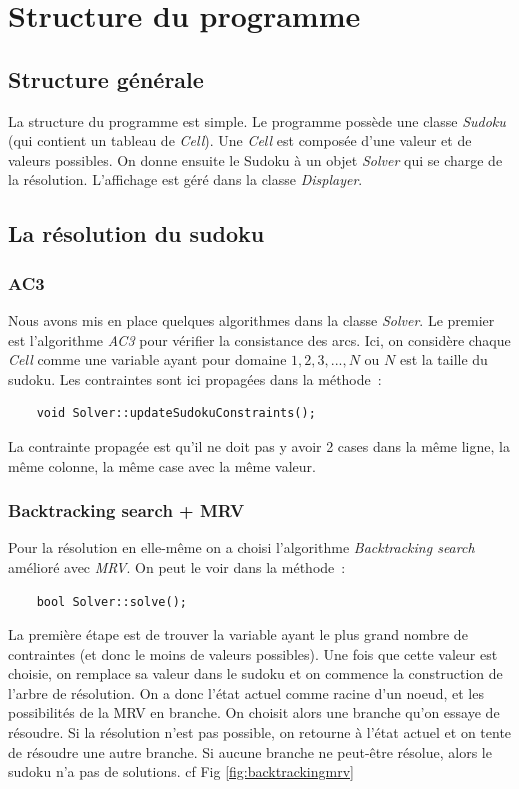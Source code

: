 \documentclass{article}
\begin{document}
\section{Structure du programme}
\subsection{Structure générale}

La structure du programme est simple. Le programme possède une classe \emph{Sudoku} (qui contient un tableau de \emph{Cell}). Une \emph{Cell} est composée d'une valeur et de valeurs possibles. On donne ensuite le Sudoku à un objet \emph{Solver} qui se charge de la résolution. L'affichage est géré dans la classe \emph{Displayer}.

\subsection{La résolution du sudoku}

\subsubsection{AC3}

Nous avons mis en place quelques algorithmes dans la classe \emph{Solver}. Le premier est l'algorithme \emph{AC3} pour vérifier la consistance des arcs. Ici, on considère chaque \emph{Cell} comme une variable ayant pour domaine ${1,2,3,...,N}$ ou $N$ est la taille du sudoku. Les contraintes sont ici propagées dans la méthode~:

\begin{verbatim}
	void Solver::updateSudokuConstraints();
\end{verbatim}

La contrainte propagée est qu'il ne doit pas y avoir 2 cases dans la même ligne, la même colonne, la même case avec la même valeur.

\subsubsection{Backtracking search + MRV}

Pour la résolution en elle-même on a choisi l'algorithme \emph{Backtracking search} amélioré avec \emph{MRV}. On peut le voir dans la méthode~:
\begin{verbatim}
	bool Solver::solve();
\end{verbatim}

La première étape est de trouver la variable ayant le plus grand nombre de contraintes (et donc le moins de valeurs possibles). Une fois que cette valeur est choisie, on remplace sa valeur dans le sudoku et on commence la construction de l'arbre de résolution. On a donc l'état actuel comme racine d'un noeud, et les possibilités de la MRV en branche. On choisit alors une branche qu'on essaye de résoudre. Si la résolution n'est pas possible, on retourne à l'état actuel et on tente de résoudre une autre branche. Si aucune branche ne peut-être résolue, alors le sudoku n'a pas de solutions. cf Fig \ref{fig:backtrackingmrv}
\end{document}
